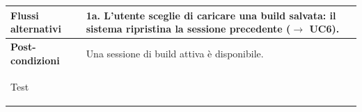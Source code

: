 \documentclass[11pt, a4paper]{article}
\begin{document}
\begin{tabularx}{\textwidth}{|>{\bfseries}p{3.8cm}|X|}
\hline

Flussi alternativi & 1a. L'utente sceglie di caricare una build salvata: il sistema ripristina la sessione precedente ($\rightarrow$ UC6). \\

\hline

Post-condizioni & Una sessione di build attiva è disponibile. \\

\hline

Test & \\

\hline

\end{tabularx}



\vspace{10pt}




\noindent
\end{document}
